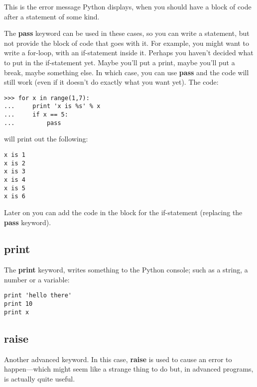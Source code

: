 This is the error message Python displays, when you should have a block of code after a statement of some kind.
\par
The \textbf{pass} keyword can be used in these cases, so you can write a statement, but not provide the block of code that goes with it.  For example, you might want to write a for-loop, with an if-statement inside it.  Perhaps you haven't decided what to put in the if-statement yet.  Maybe you'll put a print, maybe you'll put a break, maybe something else.  In which case, you can use \textbf{pass} and the code will still work (even if it doesn't do exactly what you want yet).  The code:

\begin{listing}
\begin{verbatim}
>>> for x in range(1,7):
...     print 'x is %s' % x
...     if x == 5:
...         pass
\end{verbatim}
\end{listing}

\noindent
will print out the following:

\begin{listing}
\begin{verbatim}
x is 1
x is 2
x is 3
x is 4
x is 5
x is 6
\end{verbatim}
\end{listing}

\noindent
Later on you can add the code in the block for the if-statement (replacing the \textbf{pass} keyword).

\subsection*{print}

The \textbf{print} keyword, writes something to the Python console; such as a string, a number or a variable:

\begin{listing}
\begin{verbatim}
print 'hello there'
print 10
print x
\end{verbatim}
\end{listing}

\subsection*{raise}

Another advanced keyword.  In this case, \textbf{raise} is used to cause an error to happen---which might seem like a strange thing to do but, in advanced programs, is actually quite useful.

